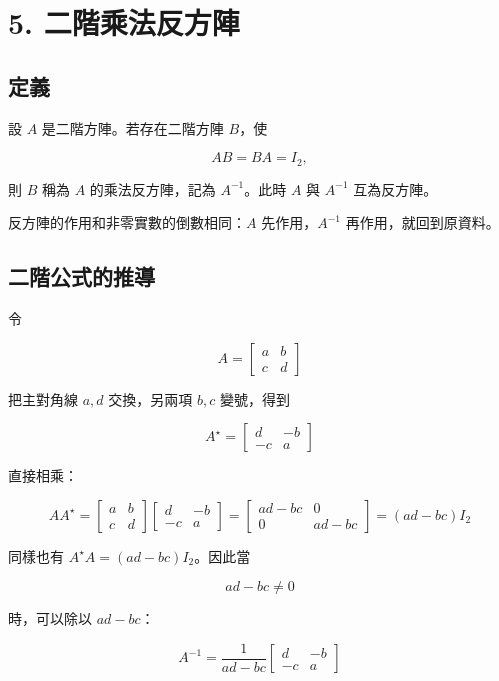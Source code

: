 \documentclass[11pt,a4paper]{article}
\begin{document}
\section{5. 二階乘法反方陣}\label{ux4e8cux968eux4e58ux6cd5ux53cdux65b9ux9663}

\subsection{定義}\label{ux5b9aux7fa9}

設 \(A\) 是二階方陣。若存在二階方陣 \(B\)，使

\[
AB=BA=I_2,
\]

則 \(B\) 稱為 \(A\) 的乘法反方陣，記為 \(A^{-1}\)。此時 \(A\) 與 \(A^{-1}\) 互為反方陣。

反方陣的作用和非零實數的倒數相同：\(A\) 先作用，\(A^{-1}\) 再作用，就回到原資料。

\subsection{二階公式的推導}\label{ux4e8cux968eux516cux5f0fux7684ux63a8ux5c0e}

令

\[
A=\begin{bmatrix}a&b\\c&d\end{bmatrix}
\]

把主對角線 \(a,d\) 交換，另兩項 \(b,c\) 變號，得到

\[
A^\star=\begin{bmatrix}d&-b\\-c&a\end{bmatrix}
\]

直接相乘：

\[
AA^\star
=\begin{bmatrix}a&b\\c&d\end{bmatrix}
\begin{bmatrix}d&-b\\-c&a\end{bmatrix}
=\begin{bmatrix}ad-bc&0\\0&ad-bc\end{bmatrix}
=(ad-bc)I_2
\]

同樣也有 \(A^\star A=(ad-bc)I_2\)。因此當

\[
ad-bc\ne0
\]

時，可以除以 \(ad-bc\)：

\[
\boxed{
A^{-1}=\frac{1}{ad-bc}
\begin{bmatrix}d&-b\\-c&a\end{bmatrix}}
\]
\end{document}

